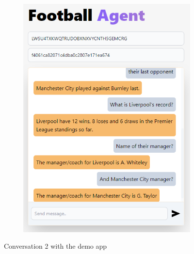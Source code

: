 \documentclass[10pt,a4paper,twocolumn]{article}
\begin{document}
\begin{figure}
\begin{subfigure}[b]{0.48\textwidth}
        \includegraphics[width=\textwidth]{assets/Screenshot_10.png}
    \end{subfigure}
    \caption*{Conversation 2 with the demo app}
\end{figure}
\end{document}

